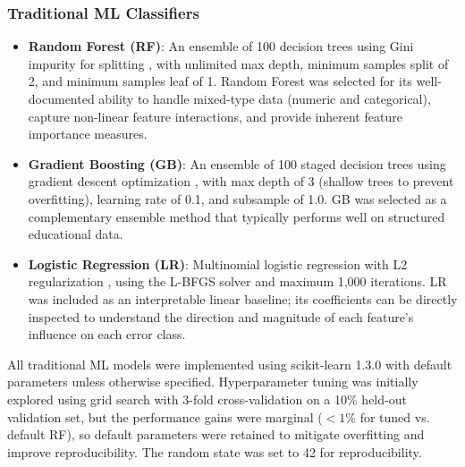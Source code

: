 \documentclass[10pt,a4paper]{article}
\begin{document}
\subsubsection*{Traditional ML Classifiers}
\begin{itemize}
    \item \textbf{Random Forest (RF)}: An ensemble of 100 decision trees using
          Gini impurity for splitting \cite{breiman2001random}, with unlimited max depth, minimum
          samples split of 2, and minimum samples leaf of 1. Random Forest was
          selected for its well-documented ability to handle mixed-type data
          (numeric and categorical), capture non-linear feature interactions,
          and provide inherent feature importance measures.
    \item \textbf{Gradient Boosting (GB)}: An ensemble of 100 staged
          decision trees using gradient descent optimization \cite{friedman2001greedy}, with max depth
          of 3 (shallow trees to prevent overfitting), learning rate of 0.1,
          and subsample of 1.0. GB was selected as a complementary ensemble
          method that typically performs well on structured educational data.
    \item \textbf{Logistic Regression (LR)}: Multinomial logistic regression
          with L2 regularization \cite{hosmer2013logistic}, using the L-BFGS solver and maximum 1,000
          iterations. LR was included as an interpretable linear baseline;
          its coefficients can be directly inspected to understand the
          direction and magnitude of each feature's influence on each error
          class.
\end{itemize}

All traditional ML models were implemented using scikit-learn 1.3.0 \cite{pedregosa2011scikit} with
default parameters unless otherwise specified. Hyperparameter tuning was
initially explored using grid search with 3-fold cross-validation on a 10\%
held-out validation set, but the performance gains were marginal ($< 1\%$ for
tuned vs. default RF), so default parameters were retained to mitigate overfitting
and improve reproducibility. The random state was set to 42 for reproducibility.
\end{document}
